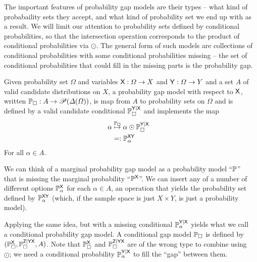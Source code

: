The important features of probability gap models are their types -- what kind of probabaility sets they accept, and what kind of probability set we end up with as a result. We will limit our attention to probability sets defined by conditional probabilities, so that the intersection operation corresponds to the product of conditional probabilities via $\odot$. The general form of such models are collections of conditional probabilities with some conditional probabilities missing -- the set of conditional probabilities that could fill in the missing parts is the probability gap.

\begin{definition}\label{def:order1_bycond}
Given probability set $\Omega$ and variables $\mathsf{X}:\Omega\to X$ and $\mathsf{Y}:\Omega\to Y$ and a set $A$ of valid candidate distributions on $X$, a probability gap model with respect to $\mathsf{X}$, written $\mathbb{P}_\square: A\to \mathscr{P}(\Delta(\Omega))$, is map from $A$ to probability sets on $\Omega$ and is defined by a valid candidate conditional $\mathbb{P}_\square^{\mathsf{Y}|\mathsf{X}}$ and implements the map
\begin{align}
	\alpha &\overset{\mathbb{P}_\square}{\mapsto} \alpha\odot\mathbb{P}_\square^{\mathsf{Y}|\mathsf{X}}\\
	&=: \mathbb{P}_\alpha^{\mathsf{XY}}
\end{align}
For all $\alpha\in A$.
\end{definition}

We can think of a marginal probability gap model as a probability model ``$\mathbb{P}$'' that is missing the marginal probability ``$\mathbb{P}^{\mathsf{X}}$''. We can insert any of a number of different options $\mathbb{P}_\alpha^{\mathsf{X}}$ for each $\alpha\in A$, an operation that yields the probability set defined by $\mathbb{P}_\alpha^{\mathsf{X}\mathsf{Y}}$ (which, if the sample space is just $X\times Y$, is just a probability model).

Applying the same idea, but with a missing conditional $\mathbb{P}_\alpha^{\mathsf{Y}|\mathsf{X}}$ yields what we call a conditional probability gap model. A conditional gap model $\mathbb{P}_\square$ is defined by $(\mathbb{P}_\square^{\mathsf{X}},\mathbb{P}_\square^{\mathsf{Z}|\mathsf{YX}},A)$. Note that $\mathbb{P}_\square^{\mathsf{X}}$ and $\mathbb{P}_\square^{\mathsf{Z}|\mathsf{YX}}$ are of the wrong type to combine using $\odot$; we need a conditional probability $\mathbb{P}_\alpha^{\mathsf{Y}|\mathsf{X}}$ to fill the ``gap'' between them.

